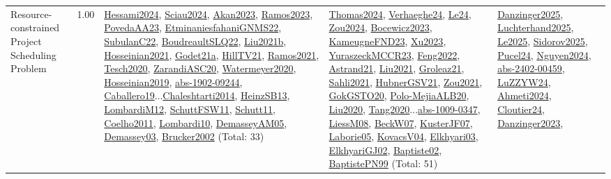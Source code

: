 {\begin{longtable}{p{3cm}r>{\raggedright\arraybackslash}p{6cm}>{\raggedright\arraybackslash}p{6cm}>{\raggedright\arraybackslash}p{8cm}}
\index{Resource-constrained Project Scheduling Problem}\index{Classification!Resource-constrained Project Scheduling Problem}Resource-constrained Project Scheduling Problem &  1.00 & \hyperref[detail:Hessami2024]{Hessami2024}, \hyperref[detail:Sciau2024]{Sciau2024}, \hyperref[detail:Akan2023]{Akan2023}, \hyperref[detail:Ramos2023]{Ramos2023}, \hyperref[detail:PovedaAA23]{PovedaAA23}, \hyperref[detail:EtminaniesfahaniGNMS22]{EtminaniesfahaniGNMS22}, \hyperref[detail:SubulanC22]{SubulanC22}, \hyperref[detail:BoudreaultSLQ22]{BoudreaultSLQ22}, \hyperref[detail:Liu2021b]{Liu2021b}, \hyperref[detail:Hosseinian2021]{Hosseinian2021}, \hyperref[detail:Godet21a]{Godet21a}, \hyperref[detail:HillTV21]{HillTV21}, \hyperref[detail:Ramos2021]{Ramos2021}, \hyperref[detail:Tesch2020]{Tesch2020}, \hyperref[detail:ZarandiASC20]{ZarandiASC20}, \hyperref[detail:Watermeyer2020]{Watermeyer2020}, \hyperref[detail:Hosseinian2019]{Hosseinian2019}, \hyperref[detail:abs-1902-09244]{abs-1902-09244}, \hyperref[detail:Caballero19]{Caballero19}...\hyperref[detail:Chaleshtarti2014]{Chaleshtarti2014}, \hyperref[detail:HeinzSB13]{HeinzSB13}, \hyperref[detail:LombardiM12]{LombardiM12}, \hyperref[detail:SchuttFSW11]{SchuttFSW11}, \hyperref[detail:Schutt11]{Schutt11}, \hyperref[detail:Coelho2011]{Coelho2011}, \hyperref[detail:Lombardi10]{Lombardi10}, \hyperref[detail:DemasseyAM05]{DemasseyAM05}, \hyperref[detail:Demassey03]{Demassey03}, \hyperref[detail:Brucker2002]{Brucker2002} (Total: 33) & \hyperref[detail:Thomas2024]{Thomas2024}, \hyperref[detail:Verhaeghe24]{Verhaeghe24}, \hyperref[detail:Le24]{Le24}, \hyperref[detail:Zou2024]{Zou2024}, \hyperref[detail:Bocewicz2023]{Bocewicz2023}, \hyperref[detail:KameugneFND23]{KameugneFND23}, \hyperref[detail:Xu2023]{Xu2023}, \hyperref[detail:YuraszeckMCCR23]{YuraszeckMCCR23}, \hyperref[detail:Feng2022]{Feng2022}, \hyperref[detail:Astrand21]{Astrand21}, \hyperref[detail:Liu2021]{Liu2021}, \hyperref[detail:Groleaz21]{Groleaz21}, \hyperref[detail:Sahli2021]{Sahli2021}, \hyperref[detail:HubnerGSV21]{HubnerGSV21}, \hyperref[detail:Zou2021]{Zou2021}, \hyperref[detail:GokGSTO20]{GokGSTO20}, \hyperref[detail:Polo-MejiaALB20]{Polo-MejiaALB20}, \hyperref[detail:Liu2020]{Liu2020}, \hyperref[detail:Tang2020]{Tang2020}...\hyperref[detail:abs-1009-0347]{abs-1009-0347}, \hyperref[detail:LiessM08]{LiessM08}, \hyperref[detail:BeckW07]{BeckW07}, \hyperref[detail:KusterJF07]{KusterJF07}, \hyperref[detail:Laborie05]{Laborie05}, \hyperref[detail:KovacsV04]{KovacsV04}, \hyperref[detail:Elkhyari03]{Elkhyari03}, \hyperref[detail:ElkhyariGJ02]{ElkhyariGJ02}, \hyperref[detail:Baptiste02]{Baptiste02}, \hyperref[detail:BaptistePN99]{BaptistePN99} (Total: 51) & \hyperref[detail:Danzinger2025]{Danzinger2025}, \hyperref[detail:Luchterhand2025]{Luchterhand2025}, \hyperref[detail:Le2025]{Le2025}, \hyperref[detail:Sidorov2025]{Sidorov2025}, \hyperref[detail:Pucel24]{Pucel24}, \hyperref[detail:Nguyen2024]{Nguyen2024}, \hyperref[detail:abs-2402-00459]{abs-2402-00459}, \hyperref[detail:LuZZYW24]{LuZZYW24}, \hyperref[detail:Ahmeti2024]{Ahmeti2024}, \hyperref[detail:Cloutier24]{Cloutier24}, \hyperref[detail:Danzinger2023]{Danzinger2023}, 
\end{longtable}}

